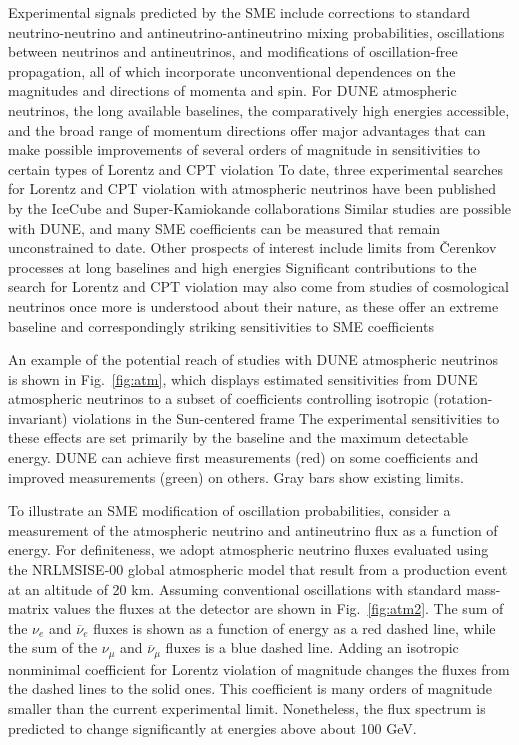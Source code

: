 Experimental signals predicted by the SME include
corrections to standard neutrino-neutrino 
and antineutrino-antineutrino mixing probabilities,
oscillations between neutrinos and antineutrinos,
and modifications of oscillation-free propagation,
all of which incorporate unconventional dependences
on the magnitudes and directions of momenta and spin.
For DUNE atmospheric neutrinos,
the long available baselines,
the comparatively high energies accessible,
and the broad range of momentum directions
offer major advantages that can make possible 
improvements of several orders of magnitude
in sensitivities to certain types of Lorentz and CPT violation
To date,
three experimental searches for Lorentz and CPT violation
with atmospheric neutrinos have been published 
by the IceCube and Super-Kamiokande collaborations
Similar studies are possible with DUNE,
and many SME coefficients can be measured that remain unconstrained to date.
Other prospects of interest include limits from \v Cerenkov processes
at long baselines and high energies
Significant contributions to the search 
for Lorentz and CPT violation may also 
come from studies of cosmological neutrinos
once more is understood about their nature,
as these offer an extreme baseline
and correspondingly striking sensitivities
to SME coefficients

An example of the potential reach of studies with DUNE atmospheric neutrinos
is shown in Fig.\ \ref{fig:atm},
which displays estimated sensitivities
from DUNE atmospheric neutrinos to a subset of coefficients 
controlling isotropic (rotation-invariant) violations 
in the Sun-centered frame
The experimental sensitivities to these effects
are set primarily by the baseline and the maximum detectable energy.
DUNE can achieve first measurements (red) on some coefficients
and improved measurements (green) on others.
Gray bars show existing limits.

To illustrate an SME modification of oscillation probabilities,
consider a measurement of the atmospheric neutrino and antineutrino flux
as a function of energy.
For definiteness,
we adopt atmospheric neutrino fluxes 
evaluated using the NRLMSISE-00 global atmospheric model
that result from a production event at an altitude of 20 km.
Assuming conventional oscillations with standard mass-matrix values 
the fluxes at the detector are shown in Fig.\ \ref{fig:atm2}.
The sum of the $\nu_e$ and $\overline\nu_e$ fluxes
is shown as a function of energy as a red dashed line, 
while the sum of the $\nu_\mu$ and $\overline\nu_\mu$ fluxes 
is a blue dashed line. 
Adding an isotropic nonminimal coefficient for Lorentz violation
of magnitude %
changes the fluxes from the dashed lines to the solid ones.
This coefficient is many orders of magnitude smaller
than the current experimental limit.
Nonetheless,
the flux spectrum is predicted to change significantly 
at energies above about 100 GeV. 

